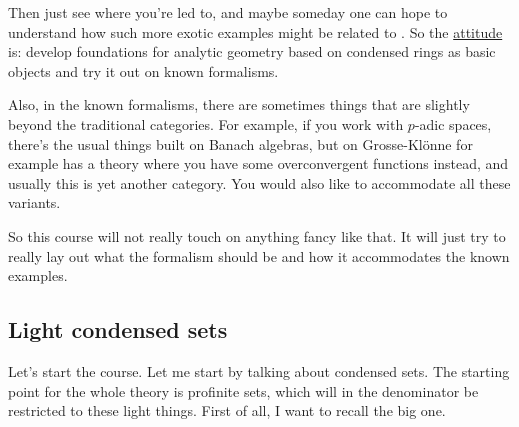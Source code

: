 Then just see where you're led to, and maybe someday one can hope to understand how such more exotic examples might be related to . So the \underline{attitude} is: develop foundations for analytic geometry based on condensed rings as basic objects and try it out on known formalisms.

Also, in the known formalisms, there are sometimes things that are slightly beyond the traditional categories. For example, if you work with $p$-adic spaces, there's the usual things built on Banach algebras, but on Grosse-Klönne  for example has a theory where you have some overconvergent functions instead, and usually this is yet another category. You would also like to accommodate all these variants.


So this course will not really touch on anything fancy like that. It will just try to really lay out what the formalism should be and how it accommodates the known examples.

\subsection{Light condensed sets} \label{subsec:light_condensed_sets}
Let's start the course. Let me start by talking about condensed sets. The starting point for the whole theory is profinite sets, which will in the denominator  be restricted to these light things. First of all, I want to recall the big one.

